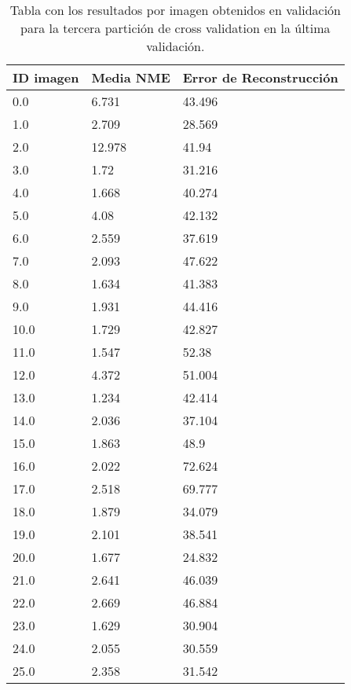 \begin{table}[!ht]
    \centering
    \caption{Tabla con los resultados por imagen obtenidos en validación para la tercera partición de cross validation en la última validación.}
    \begin{tabular}{|l|l|l|}
    \hline
        ID imagen & Media NME & Error de Reconstrucción \\ \hline
        0.0 & 6.731 & 43.496 \\ \hline
        1.0 & 2.709 & 28.569 \\ \hline
        2.0 & 12.978 & 41.94 \\ \hline
        3.0 & 1.72 & 31.216 \\ \hline
        4.0 & 1.668 & 40.274 \\ \hline
        5.0 & 4.08 & 42.132 \\ \hline
        6.0 & 2.559 & 37.619 \\ \hline
        7.0 & 2.093 & 47.622 \\ \hline
        8.0 & 1.634 & 41.383 \\ \hline
        9.0 & 1.931 & 44.416 \\ \hline
        10.0 & 1.729 & 42.827 \\ \hline
        11.0 & 1.547 & 52.38 \\ \hline
        12.0 & 4.372 & 51.004 \\ \hline
        13.0 & 1.234 & 42.414 \\ \hline
        14.0 & 2.036 & 37.104 \\ \hline
        15.0 & 1.863 & 48.9 \\ \hline
        16.0 & 2.022 & 72.624 \\ \hline
        17.0 & 2.518 & 69.777 \\ \hline
        18.0 & 1.879 & 34.079 \\ \hline
        19.0 & 2.101 & 38.541 \\ \hline
        20.0 & 1.677 & 24.832 \\ \hline
        21.0 & 2.641 & 46.039 \\ \hline
        22.0 & 2.669 & 46.884 \\ \hline
        23.0 & 1.629 & 30.904 \\ \hline
        24.0 & 2.055 & 30.559 \\ \hline
        25.0 & 2.358 & 31.542 \\ \hline
    \end{tabular}
    \label{table::ModelBase_Partition3}
\end{table}


